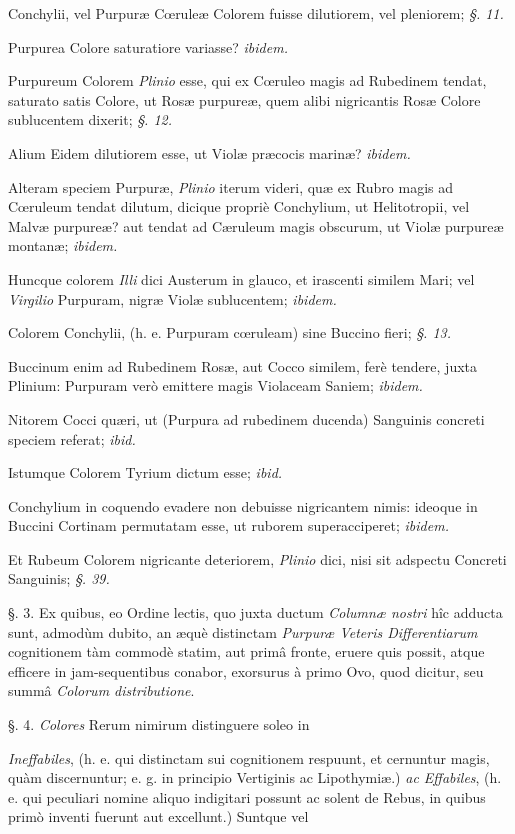 \documentclass[a4paper, 11pt, oneside, polutonikogreek, german]{article}
\begin{document}
Conchylii, vel Purpuræ Cœruleæ Colorem fuisse dilutiorem, vel pleniorem; \emph{§. 11.}

Purpurea Colore saturatiore variasse? \emph{ibidem.}

Purpureum Colorem \emph{Plinio} esse, qui ex Cœruleo magis ad Rubedinem tendat, saturato satis Colore, ut Rosæ purpureæ, quem alibi nigricantis Rosæ Colore sublucentem dixerit; \emph{§. 12.}

Alium Eidem dilutiorem esse, ut Violæ præcocis marinæ? \emph{ibidem.}

Alteram speciem Purpuræ, \emph{Plinio} iterum videri, quæ ex Rubro magis ad Cœruleum tendat dilutum, dicique propriè Conchylium, ut Helitotropii, vel Malvæ purpureæ? aut tendat ad Cæruleum magis obscurum, ut Violæ purpureæ montanæ; \emph{ibidem.}

Huncque colorem \emph{Illi} dici Austerum in glauco, et irascenti similem Mari; vel \emph{Virgilio} Purpuram, nigræ Violæ sublucentem; \emph{ibidem.}

Colorem Conchylii, (h. e. Purpuram cœruleam) sine Buccino fieri; \emph{§. 13.}

Buccinum enim ad Rubedinem Rosæ, aut Cocco similem, ferè tendere, juxta Plinium: Purpuram verò emittere magis Violaceam Saniem; \emph{ibidem.}

Nitorem Cocci quæri, ut (Purpura ad rubedinem ducenda) Sanguinis concreti speciem referat; \emph{ibid.}

Istumque Colorem Tyrium dictum esse; \emph{ibid.}

Conchylium in coquendo evadere non debuisse nigricantem nimis: ideoque in Buccini Cortinam permutatam esse, ut ruborem superacciperet; \emph{ibidem.}

Et Rubeum Colorem nigricante deteriorem, \emph{Plinio} dici, nisi sit adspectu Concreti Sanguinis; \emph{§. 39.}

§. 3. Ex quibus, eo Ordine lectis, quo juxta ductum \emph{Columnæ nostri} hîc adducta sunt, admodùm dubito, an æquè distinctam \emph{Purpuræ Veteris Differentiarum} cognitionem tàm commodè statim, aut primâ fronte, eruere quis possit, atque efficere in jam-sequentibus conabor, exorsurus à primo Ovo, quod dicitur, seu summâ \emph{Colorum distributione}.

§. 4. \emph{Colores} Rerum nimirum distinguere soleo in

\emph{Ineffabiles}, (h. e. qui distinctam sui cognitionem respuunt, et cernuntur magis, quàm discernuntur; e. g. in principio Vertiginis ac Lipothymiæ.) \emph{ac Effabiles}, (h. e. qui peculiari nomine aliquo indigitari possunt ac solent de Rebus, in quibus primò inventi fuerunt aut excellunt.) Suntque vel
\end{document}
